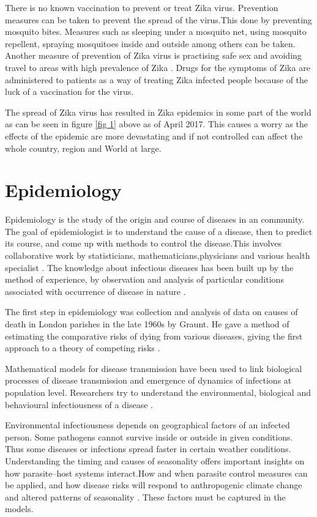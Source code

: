 There is no known vaccination to prevent or treat  Zika virus. Prevention measures can be taken to prevent the spread of the virus.This done by preventing mosquito bites. Measures such as sleeping under a mosquito net, using mosquito repellent, spraying mosquitoes inside and outside among others can be taken. Another measure of prevention of Zika virus is practising safe sex and avoiding travel to areas with high prevalence of Zika . Drugs for the symptoms of Zika are administered to patients as a way of treating Zika infected people because of the luck of a vaccination for the virus.


The spread of Zika virus has resulted in Zika epidemics in some part of the world as can be seen in figure \ref{fig 1} above as of April 2017. This causes a worry as the effects of the epidemic are more devastating and if not controlled can affect the whole country, region and World at large. 


 \section{Epidemiology}
 
 Epidemiology is the study of the origin and course of diseases in an community. The goal of epidemiologist is to understand the cause of a disease, then to predict its course, and come up with methods to control the disease.This involves collaborative work by statisticians, mathematicians,physicians and various health specialist \citep{Brauer2017}. The knowledge about infectious diseases has been built up by the method of experience, by observation and analysis of particular conditions associated with occurrence of disease in nature \citep{frost1923importance}.
 
 The first step in epidemiology was collection and analysis of data on causes of death in London parishes in the late 1960s by Graunt. He  gave a method of estimating the comparative risks of dying from various diseases, giving the first approach to a theory of competing risks \citep{Brauer2017}.
 
 Mathematical models for disease transmission have been used to link biological processes of disease transmission and emergence of dynamics of infections at  population level. Researchers try to understand the environmental, biological  and behavioural infectiousness of a disease .
 
  Environmental infectiousness depends on geographical factors of an infected person. Some pathogens cannot survive inside or outside in given conditions. Thus some diseases or infections spread faster in certain weather conditions\citep{grass}. Understanding the timing and causes of seasonality offers important insights on how parasite–host systems interact.How and when parasite control measures can be applied, and how disease risks will respond to anthropogenic climate change and altered patterns of seasonality \citep{altizer}. These factors must be captured in the models.
  
